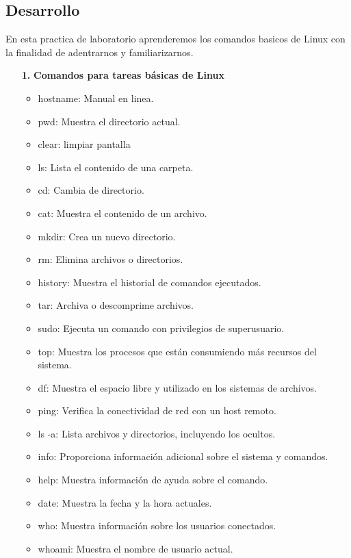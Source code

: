 \documentclass[11pt,twoside]{book}
\begin{document}
\subsection*{Desarrollo}
En esta practica de laboratorio aprenderemos los comandos basicos de Linux con la finalidad de adentrarnos y familiarizarnos. 
\begin{enumerate}
  \item[\textbf{1.}] \textbf{Comandos para tareas básicas de Linux} 
  \begin{itemize}
      \item hostname: Manual en linea.
      \item pwd: Muestra el directorio actual.
      \item clear: limpiar pantalla
      \item ls: Lista el contenido de una carpeta.
      \item cd: Cambia de directorio.
      \item cat: Muestra el contenido de un archivo.
      \item mkdir: Crea un nuevo directorio.
      \item rm: Elimina archivos o directorios.
      \item history: Muestra el historial de comandos ejecutados.
      \item tar: Archiva o descomprime archivos.
      \item sudo: Ejecuta un comando con privilegios de superusuario.
      \item top: Muestra los procesos que están consumiendo más recursos del sistema.
      \item df: Muestra el espacio libre y utilizado en los sistemas de archivos.
      \item ping: Verifica la conectividad de red con un host remoto.
      \item ls -a: Lista archivos y directorios, incluyendo los ocultos.
      \item info: Proporciona información adicional sobre el sistema y comandos.
      \item help: Muestra información de ayuda sobre el comando.
       \item date: Muestra la fecha y la hora actuales.
       \item who: Muestra información sobre los usuarios conectados.
     \item whoami: Muestra el nombre de usuario actual.
  \end{itemize}
        \begin{minipage}{\linewidth}

\end{minipage}
\end{enumerate}
\end{document}

